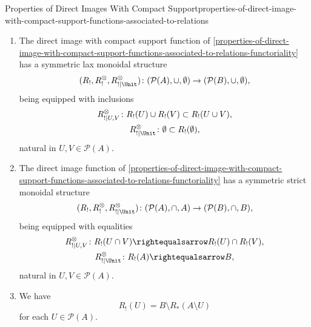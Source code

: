 \begin{proposition}{Properties of Direct Images With Compact Support}{properties-of-direct-image-with-compact-support-functions-associated-to-relations}
\begin{enumerate}
\[\begin{gathered}
                    R_{!}(A)       = B,
                \end{gathered}
            \]%
            natural in $U,V\in\mathcal{P}(A)$.
        \item\label{properties-of-direct-image-with-compact-support-functions-associated-to-relations-symmetric-lax-monoidality-with-respect-to-unions}The direct image with compact support function of \cref{properties-of-direct-image-with-compact-support-functions-associated-to-relations-functoriality} has a symmetric lax monoidal structure
            \[
                (R_{!},R^{\otimes}_{!},R^{\otimes}_{!|\Unit})
                \colon
                (\mathcal{P}(A),\cup,\emptyset)
                \to
                (\mathcal{P}(B),\cup,\emptyset),
            \]%
            being equipped with inclusions%
            \[
                \begin{gathered}
                    R^{\otimes}_{!|U,V}   \colon R_{!}(U)\cup R_{!}(V) \subset R_{!}(U\cup V),\\
                    R^{\otimes}_{!|\Unit} \colon \emptyset               \subset R_{!}(\emptyset),
                \end{gathered}
            \]%
            natural in $U,V\in\mathcal{P}(A)$.
        \item\label{properties-of-direct-image-with-compact-support-functions-associated-to-relations-symmetric-strict-monoidality-with-respect-to-intersections}The direct image function of \cref{properties-of-direct-image-with-compact-support-functions-associated-to-relations-functoriality} has a symmetric strict monoidal structure
            \[
                (R_{!},R^{\otimes}_{!},R^{\otimes}_{!|\Unit})
                \colon
                (\mathcal{P}(A),\cap,A)
                \to
                (\mathcal{P}(B),\cap,B),
            \]%
            being equipped with equalities%
            \[
                \begin{gathered}
                    R^{\otimes}_{!|U,V}   \colon R_{!}(U\cap V) \rightequalsarrow R_{!}(U)\cap R_{!}(V),\\
                    R^{\otimes}_{!|\Unit} \colon R_{!}(A)       \rightequalsarrow B,
                \end{gathered}
            \]%
            natural in $U,V\in\mathcal{P}(A)$.
        \item\label{properties-of-direct-image-with-compact-support-functions-associated-to-relations-relation-to-direct-images}We have
            \[
                R_{!}(U)%
                =%
                B\setminus R_{*}(A\setminus U)
            \]%
            for each $U\in\mathcal{P}(A)$.
    \end{enumerate}
\end{proposition}
